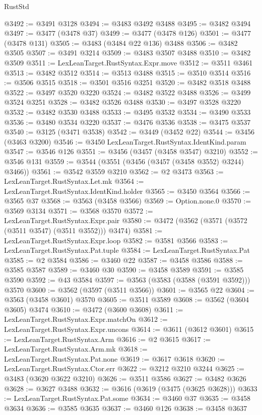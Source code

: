 \begin{lexlean}{RustStd}
\begin{coremodule}
{\begin{coremodule}
{{{{{{{{{{{{{{{{{{{{{{{{{{{{{{{{{{{{{{{{{{{{{@3492 := @3491 @3128
@3494 := @3483 @3492 @3488
@3495 := @3482 @3494
@3497 := @3477 (@3478 @37)
@3499 := @3477 (@3478 @126)
@3501 := @3477 (@3478 @131)
@3505 := @3483 (@3484 @22 @136) @3488
@3506 := @3482 @3505
@3507 := @3491 @3214
@3509 := @3483 @3507 @3488
@3510 := @3482 @3509
@3511 := LexLeanTarget.RustSyntax.Expr.move
@3512 := @3511 @3461
@3513 := @3482 @3512
@3514 := @3513 @3488
@3515 := @3510 @3514
@3516 := @3506 @3515
@3518 := @3501 @3516 @3251
@3520 := @3482 @3518 @3488
@3522 := @3497 @3520 @3220
@3524 := @3482 @3522 @3488
@3526 := @3499 @3524 @3251
@3528 := @3482 @3526 @3488
@3530 := @3497 @3528 @3220
@3532 := @3482 @3530 @3488
@3533 := @3495 @3532
@3534 := @3490 @3533
@3536 := @3480 @3534 @3220
@3537 := @3476 @3536
@3538 := @3475 @3537
@3540 := @3125 (@3471 @3538)
@3542 := @3449 (@3452 @22)
@3544 := @3456 (@3463 @3200)
@3546 := @3450 LexLeanTarget.RustSyntax.IdentKind.param
@3547 := @3546 @126
@3551 := @3456 (@3457 (@3458 @3547) @3210)
@3552 := @3546 @131
@3559 := @3544 (@3551 (@3456 (@3457 (@3458 @3552) @3244) @3466))
@3561 := @3542 @3559 @3210
@3562 := @2 @3473
@3563 := LexLeanTarget.RustSyntax.Let.mk
@3564 := LexLeanTarget.RustSyntax.IdentKind.holder
@3565 := @3450 @3564
@3566 := @3565 @37
@3568 := @3563 (@3458 @3566)
@3569 := Option.none.{0}
@3570 := @3569 @3134
@3571 := @3568 @3570
@3572 := LexLeanTarget.RustSyntax.Expr.pair
@3580 := @3472 (@3562 (@3571 (@3572 (@3511 @3547) (@3511 @3552))) @3474)
@3581 := LexLeanTarget.RustSyntax.Expr.loop
@3582 := @3581 @3566
@3583 := LexLeanTarget.RustSyntax.Pat.tuple
@3584 := LexLeanTarget.RustSyntax.Pat
@3585 := @2 @3584
@3586 := @3460 @22
@3587 := @3458 @3586
@3588 := @3585 @3587
@3589 := @3460 @30
@3590 := @3458 @3589
@3591 := @3585 @3590
@3592 := @43 @3584
@3597 := @3563 (@3583 (@3588 (@3591 @3592))) @3570
@3600 := @3562 (@3597 (@3511 @3566))
@3601 := @3565 @22
@3604 := @3563 (@3458 @3601) @3570
@3605 := @3511 @3589
@3608 := @3562 (@3604 @3605) @3474
@3610 := @3472 (@3600 @3608)
@3611 := LexLeanTarget.RustSyntax.Expr.matchOn
@3612 := LexLeanTarget.RustSyntax.Expr.uncons
@3614 := @3611 (@3612 @3601)
@3615 := LexLeanTarget.RustSyntax.Arm
@3616 := @2 @3615
@3617 := LexLeanTarget.RustSyntax.Arm.mk
@3618 := LexLeanTarget.RustSyntax.Pat.none
@3619 := @3617 @3618
@3620 := LexLeanTarget.RustSyntax.Ctor.err
@3622 := @3212 @3210 @3244
@3625 := @3483 (@3620 @3622 @3210)
@3626 := @3511 @3586
@3627 := @3482 @3626
@3628 := @3627 @3488
@3632 := @3616 (@3619 (@3475 (@3625 @3628)))
@3633 := LexLeanTarget.RustSyntax.Pat.some
@3634 := @3460 @37
@3635 := @3458 @3634
@3636 := @3585 @3635
@3637 := @3460 @126
@3638 := @3458 @3637
}}}}}}}}}}}}}}}}}}}}}}}}}}}}}}}}}}}}}}}}}}}}}
\end{coremodule}}
\end{coremodule}
\end{lexlean}
